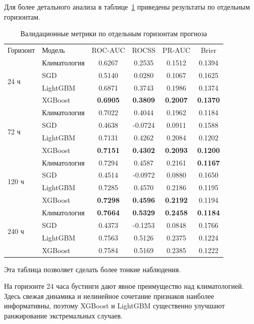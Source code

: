 Для более детального анализа в таблице~\ref{tab:station-horizon} приведены результаты по отдельным горизонтам.

\begin{table}[H]
\centering
\begin{tabular}{llcccc}
Горизонт & Модель & ROC-AUC & ROCSS & PR-AUC & Brier \\
\multirow{4}{*}{24 ч}
& Климатология & 0.6267 & 0.2535 & 0.1512 & 0.1394 \\
& SGD & 0.5140 & 0.0280 & 0.1067 & 0.1625 \\
& LightGBM & 0.6871 & 0.3743 & 0.1986 & 0.1374 \\
& XGBoost & \textbf{0.6905} & \textbf{0.3809} & \textbf{0.2007} & \textbf{0.1370} \\
\multirow{4}{*}{72 ч}
& Климатология & 0.7022 & 0.4044 & 0.1962 & 0.1184 \\
& SGD & 0.4638 & -0.0724 & 0.0911 & 0.1588 \\
& LightGBM & 0.7131 & 0.4262 & 0.2084 & 0.1202 \\
& XGBoost & \textbf{0.7151} & \textbf{0.4302} & \textbf{0.2093} & \textbf{0.1200} \\
\multirow{4}{*}{120 ч}
& Климатология & 0.7294 & 0.4587 & 0.2161 & \textbf{0.1167} \\
& SGD & 0.4514 & -0.0972 & 0.0880 & 0.1650 \\
& LightGBM & 0.7285 & 0.4570 & 0.2186 & 0.1195 \\
& XGBoost & \textbf{0.7298} & \textbf{0.4596} & \textbf{0.2192} & 0.1194 \\
\multirow{4}{*}{240 ч}
& Климатология & \textbf{0.7664} & \textbf{0.5329} & \textbf{0.2458} & \textbf{0.1184} \\
& SGD & 0.4373 & -0.1253 & 0.0848 & 0.1766 \\
& LightGBM & 0.7563 & 0.5126 & 0.2375 & 0.1224 \\
& XGBoost & 0.7584 & 0.5169 & 0.2385 & 0.1222 \\
\end{tabular}
\caption{Валидационные метрики по отдельным горизонтам прогноза}
\label{tab:station-horizon}
\end{table}

Эта таблица позволяет сделать более тонкие наблюдения.

На горизонте 24 часа бустинги дают явное преимущество над климатологией. Здесь свежая динамика и нелинейное сочетание признаков наиболее информативны, поэтому XGBoost и LightGBM существенно улучшают ранжирование экстремальных случаев.

